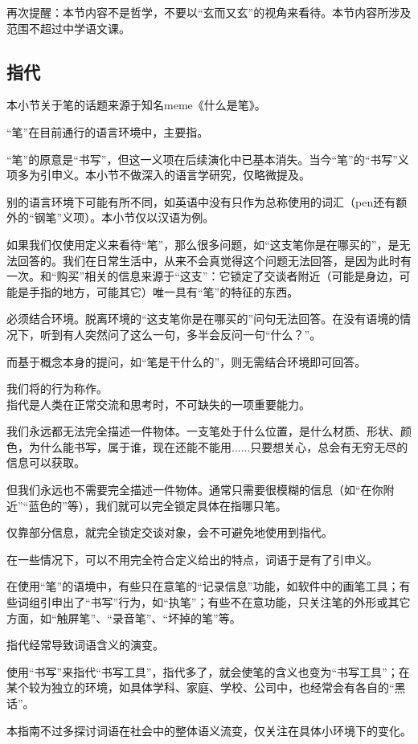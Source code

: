 \begin{explain}
再次提醒：本节内容不是哲学，不要以“玄而又玄”的视角来看待。本节内容所涉及范围不超过中学语文课。
\end{explain}
\subsection{指代}
\begin{explain}
本小节关于笔的话题来源于知名meme《什么是笔》。
\end{explain}
“笔”在目前通行的语言环境中，主要指。
\begin{explain}
“笔”的原意是“书写”，但这一义项在后续演化中已基本消失。当今“笔”的“书写”义项多为引申义。本小节不做深入的语言学研究，仅略微提及。

别的语言环境下可能有所不同，如英语中没有只作为总称使用的词汇（pen还有额外的“钢笔”义项）。本小节仅以汉语为例。
\end{explain}
如果我们仅使用定义来看待“笔”，那么很多问题，如“这支笔你是在哪买的”，是无法回答的。我们在日常生活中，从来不会真觉得这个问题无法回答，是因为此时有一次。和“购买”相关的信息来源于“这支”：它锁定了交谈者附近（可能是身边，可能是手指的地方，可能其它）唯一具有“笔”的特征的东西。
\begin{explain}
必须结合环境。脱离环境的“这支笔你是在哪买的”问句无法回答。在没有语境的情况下，听到有人突然问了这么一句，多半会反问一句“什么？”。

而基于概念本身的提问，如“笔是干什么的”，则无需结合环境即可回答。
\end{explain}
我们将的行为称作。\\指代是人类在正常交流和思考时，不可缺失的一项重要能力。
\begin{explain}
我们永远都无法完全描述一件物体。一支笔处于什么位置，是什么材质、形状、颜色，为什么能书写，属于谁，现在还能不能用......只要想关心，总会有无穷无尽的信息可以获取。

但我们永远也不需要完全描述一件物体。通常只需要很模糊的信息（如“在你附近”“蓝色的”等），我们就可以完全锁定具体在指哪只笔。

仅靠部分信息，就完全锁定交谈对象，会不可避免地使用到指代。
\end{explain}
在一些情况下，可以不用完全符合定义给出的特点，词语于是有了引申义。
\begin{examples}
在使用“笔”的语境中，有些只在意笔的“记录信息”功能，如软件中的画笔工具；有些词组引申出了“书写”行为，如“执笔”；有些不在意功能，只关注笔的外形或其它方面，如“触屏笔”、“录音笔”、“坏掉的笔”等。
\end{examples}
指代经常导致词语含义的演变。
\begin{explain}
使用“书写”来指代“书写工具”，指代多了，就会使笔的含义也变为“书写工具”；在某个较为独立的环境，如具体学科、家庭、学校、公司中，也经常会有各自的“黑话”。

本指南不过多探讨词语在社会中的整体语义流变，仅关注在具体小环境下的变化。
\end{explain}

